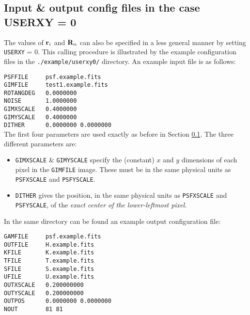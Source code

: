 \documentclass[10pt]{article}
\begin{document}
\subsection{Input \& output config files in the case USERXY = 0}\label{sect:userxy0}
The values of ${\bf r}_i$ and ${\bf R}_{\alpha}$ can also be specified in a less general manner by setting \texttt{USERXY} = 0.  This calling procedure is illustrated by the example configuration files in the \texttt{./example/userxy0/} directory.  An example input file is as follows:

\texttt{PSFFILE~~~~~psf.example.fits \\
GIMFILE~~~~~test1.example.fits \\
ROTANGDEG~~~0.0000000 \\
NOISE~~~~~~~1.0000000 \\
GIMXSCALE~~~0.4000000 \\
GIMYSCALE~~~0.4000000 \\
DITHER~~~~~~0.0000000 0.0000000 \\
}
The first four parameters are used exactly as before in Section \ref{sect:userxy0}.  The three different parameters are:
\begin{itemize}
\item \texttt{GIMXSCALE} \& \texttt{GIMYSCALE} specify the (constant) $x$ and $y$ dimensions of each pixel in the \texttt{GIMFILE} image. These must be in the same physical units as \texttt{PSFXSCALE} and \texttt{PSFYSCALE}.
\item \texttt{DITHER} gives the position, in the same physical units as \texttt{PSFXSCALE} and \texttt{PSFYSCALE}, of the \emph{exact center of the lower-leftmost pixel.}
\end{itemize}

In the same directory can be found an example output configuration file:


\texttt{GAMFILE~~~~~psf.example.fits \\
OUTFILE~~~~~H.example.fits \\
KFILE~~~~~~~K.example.fits \\
TFILE~~~~~~~T.example.fits \\
SFILE~~~~~~~S.example.fits \\
UFILE~~~~~~~U.example.fits \\
OUTXSCALE~~~0.200000000 \\
OUTYSCALE~~~0.200000000 \\
OUTPOS~~~~~~0.0000000 0.0000000 \\
NOUT~~~~~~~~81 81}
\end{document}
